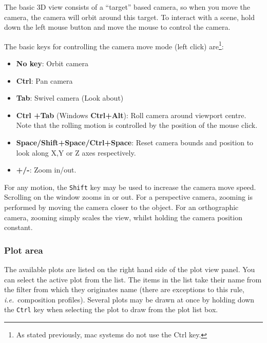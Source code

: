 \documentclass[10pt]{article}
\begin{document}
The basic 3D view consists of a ``target'' based camera, so when you move the camera, the camera will orbit around this target. To interact with a scene, hold down the left mouse button and move the mouse to control the camera.  


The basic keys for controlling the camera move mode (left click) are\footnote{As stated previously, mac systems do not use the Ctrl key.}:  
\begin{itemize}
\item  \textbf{No key}: Orbit camera 
\item \textbf{Ctrl}: Pan camera 
\item  \textbf{Tab}: Swivel camera (Look about)
\item  \textbf{Ctrl +Tab} (Windows \textbf{Ctrl+Alt}): Roll camera around viewport centre. Note that the rolling motion is controlled by the position of the mouse click.
\item \textbf{Space/Shift+Space/Ctrl+Space}: Reset camera bounds and position to look along X,Y or Z axes respectively.
\item \textbf{+/-}: Zoom in/out.

\end{itemize}
For any motion, the \texttt{Shift} key may be used to increase the camera move speed.  Scrolling on the window zooms in or out. For a perspective camera, zooming is performed by moving the camera closer to the object. For an orthographic camera, zooming simply scales the view, whilst holding the camera position constant.


\subsubsection{Plot area}
The available plots are listed on the right hand side of the plot view panel. You can select the active plot from the list. The items in the list take their name from the filter from which they originates name (there are exceptions to this rule, \emph{i.e.}\ composition profiles). Several plots may be drawn at once by holding down the \texttt{Ctrl} key when selecting the plot to draw from the plot list box.  
\end{document}
